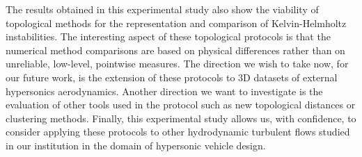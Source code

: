 The results obtained in this experimental study also show
the viability of topological methods for the representation and comparison of
Kelvin-Helmholtz
instabilities.
%
%
The interesting aspect of these topological protocols is that the
numerical method comparisons are based on physical differences rather than on
unreliable, low-level, pointwise measures.
The direction we wish to take now, for our future work, is
the extension of these protocols to 3D datasets of external hypersonics aerodynamics.
Another direction we
want to investigate is the evaluation of other tools used in the protocol such
as new topological distances \cite{pont_vis21} or clustering methods. Finally, this experimental
study allows us, with confidence, to consider applying these protocols to other
hydrodynamic turbulent flows studied in our institution in the domain of
hypersonic vehicle design.


